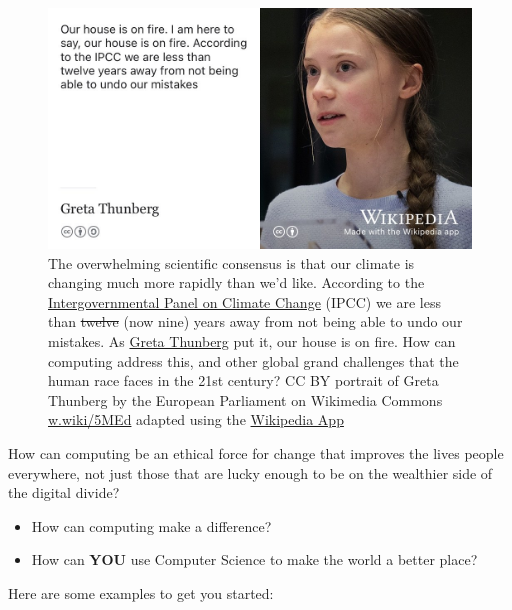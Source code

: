 \documentclass[
]{book}
\providecommand{\tightlist}{%
  \setlength{\itemsep}{0pt}\setlength{\parskip}{0pt}}
\begin{document}
\begin{figure}

{\centering \includegraphics[width=1\linewidth]{images/greta-thunberg} 

}

\caption{The overwhelming scientific consensus is that our climate is changing much more rapidly than we'd like. According to the \href{https://en.wikipedia.org/wiki/Intergovernmental_Panel_on_Climate_Change}{Intergovernmental Panel on Climate Change} (IPCC) we are less than \sout{twelve} (now nine) years away from not being able to undo our mistakes. As \href{https://en.wikipedia.org/wiki/Greta_Thunberg}{Greta Thunberg} put it, our house is on fire. \citep{gretathunberg} How can computing address this, and other global grand challenges that the human race faces in the 21st century? CC BY portrait of Greta Thunberg by the European Parliament on Wikimedia Commons \href{https://w.wiki/5MEd}{w.wiki/5MEd} adapted using the \href{https://apps.apple.com/gb/app/wikipedia/id324715238}{Wikipedia App}}\label{fig:greta-fig}
\end{figure}



How can computing be an ethical force for change that improves the lives people everywhere, not just those that are lucky enough to be on the wealthier side of the digital divide?

\begin{itemize}
\tightlist
\item
  How can computing make a difference?
\item
  How can \textbf{YOU} use Computer Science to make the world a better place?
\end{itemize}

Here are some examples to get you started:
\end{document}
